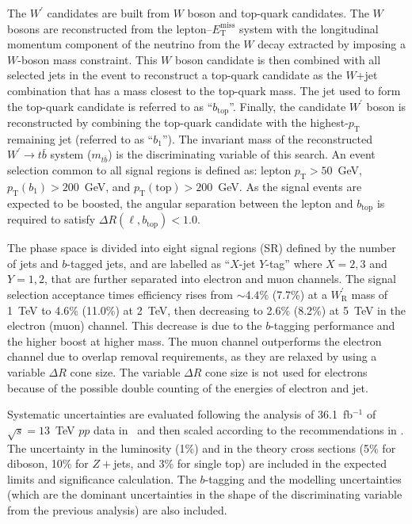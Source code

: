 The $W^\prime$ candidates are built from $W$ boson and top-quark candidates.
The $W$ bosons are reconstructed from the lepton--$E_{\mathrm{T}}^{\mathrm{miss}}$ system with
the longitudinal momentum component of the neutrino from the $W$ decay extracted by imposing a
$W$-boson mass constraint.
This $W$ boson candidate is then combined with all selected jets in the event to reconstruct
a top-quark candidate as the $W$+jet combination that has a mass closest to the top-quark mass.
The jet used to form the top-quark candidate is referred to as ``$b_{\mathrm{top}}$''.
Finally, the candidate $W^\prime$ boson is reconstructed by combining the top-quark candidate with
the  highest-$p_{\mathrm{T}}$ remaining jet (referred to as ``$b_1$''). 
The invariant mass of the reconstructed $W^\prime \rightarrow t\bar{b}$ system ($m_{t\bar{b}}$) 
is the discriminating variable of this search. 
An event selection common to all signal regions is defined as: lepton 
$p_{\textrm{T}}>50$~GeV, $p_{\textrm{T}}(b_1)> 200$~GeV, and
$p_{\textrm{T}}({\textrm{top}})> 200$~GeV. As the signal events are expected to be boosted, 
the angular separation between the lepton and $b_{\text{top}}$ is required to satisfy 
$\Delta R(\ell, b_{\text{top}})<1.0$. 

The phase space is divided into eight signal regions (SR) defined by the number of jets and 
$b$-tagged jets, and are labelled as ``$X$-jet $Y$-tag'' where $X=2, 3$ and $Y=1, 2$, 
that are further separated into electron and muon channels.
The signal selection acceptance times efficiency rises from $\sim 4.4\%$ (7.7\%) at
a $W^\prime_{\mathrm{R}}$ mass of 1~TeV to 4.6\% (11.0\%) at 2~TeV, then decreasing to
2.6\% (8.2\%) at 5~TeV in the electron (muon) channel. This decrease is due to the
$b$-tagging performance and the higher boost at higher mass.
The muon channel outperforms the electron channel due to overlap removal requirements, 
as they are relaxed by using a variable $\Delta R$ cone size. The variable $\Delta R$ cone size is not used 
for electrons because of the possible double counting of the energies of electron and jet.

Systematic uncertainties are evaluated following the analysis of 36.1~fb$^{-1}$ of
$\sqrt{s}=13$~TeV $pp$ data in~
and then scaled according to the recommendations in . 
The uncertainty in the luminosity (1\%) and in the theory cross sections (5\% for diboson, 10\% for 
$Z+$jets, and 3\% for single top) are included in the expected limits 
and significance calculation. The $b$-tagging and the modelling uncertainties (which are the dominant 
uncertainties in the shape of the discriminating variable from the previous analysis) are also included.

